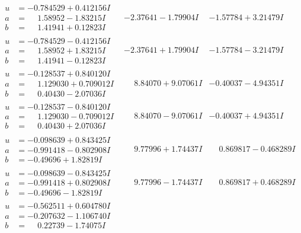 \documentclass[1p]{elsarticle_modified}
\theoremstyle{definition}
\begin{document}
$$\begin{array}{c|c|c}
\begin{aligned}
u &= -0.784529 + 0.412156 I \\
a &= \phantom{-}1.58952 - 1.83215 I \\
b &= \phantom{-}1.41941 + 0.12823 I\end{aligned}
 & -2.37641 - 1.79904 I & -1.57784 + 3.21479 I \\ \hline\begin{aligned}
u &= -0.784529 - 0.412156 I \\
a &= \phantom{-}1.58952 + 1.83215 I \\
b &= \phantom{-}1.41941 - 0.12823 I\end{aligned}
 & -2.37641 + 1.79904 I & -1.57784 - 3.21479 I \\ \hline\begin{aligned}
u &= -0.128537 + 0.840120 I \\
a &= \phantom{-}1.129030 + 0.709012 I \\
b &= \phantom{-}0.40430 - 2.07036 I\end{aligned}
 & \phantom{-}8.84070 + 9.07061 I & -0.40037 - 4.94351 I \\ \hline\begin{aligned}
u &= -0.128537 - 0.840120 I \\
a &= \phantom{-}1.129030 - 0.709012 I \\
b &= \phantom{-}0.40430 + 2.07036 I\end{aligned}
 & \phantom{-}8.84070 - 9.07061 I & -0.40037 + 4.94351 I \\ \hline\begin{aligned}
u &= -0.098639 + 0.843425 I \\
a &= -0.991418 - 0.802908 I \\
b &= -0.49696 + 1.82819 I\end{aligned}
 & \phantom{-}9.77996 + 1.74437 I & \phantom{-}0.869817 - 0.468289 I \\ \hline\begin{aligned}
u &= -0.098639 - 0.843425 I \\
a &= -0.991418 + 0.802908 I \\
b &= -0.49696 - 1.82819 I\end{aligned}
 & \phantom{-}9.77996 - 1.74437 I & \phantom{-}0.869817 + 0.468289 I \\ \hline\begin{aligned}
u &= -0.562511 + 0.604780 I \\
a &= -0.207632 - 1.106740 I \\
b &= \phantom{-}0.22739 - 1.74075 I\end{aligned}

\end{array}$$
\end{document}

